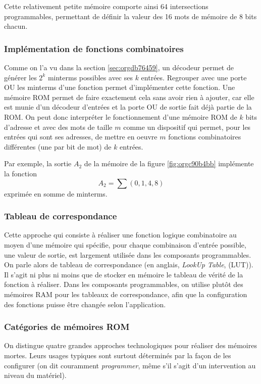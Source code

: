 \documentclass[11pt]{article}
\begin{document}
Cette relativement petite mémoire comporte ainsi 64 intersections
programmables, permettant de définir la valeur des 16 mots de mémoire
de 8 bits chacun.

\subsubsection{Implémentation de fonctions combinatoires}
\label{sec:org1dccb2e}

Comme on l'a vu dans la section \ref{sec:orgdb76459}, un décodeur permet de
générer les \(2^k\) minterms possibles avec ses \(k\)
entrées. Regrouper avec une porte OU les minterms d'une
fonction permet d'implémenter cette fonction. Une mémoire ROM permet
de faire exactement cela sans avoir rien à ajouter, car elle est munie
d'un décodeur d'entrées et la porte OU de sortie fait déjà partie de
la ROM. On peut donc interpréter le fonctionnement d'une mémoire ROM
de \(k\) bits d'adresse et avec des mots de taille \(m\) comme un
dispositif qui permet, pour les entrées qui sont ses adresses, de
mettre en oeuvre \(m\) fonctions combinatoires différentes (une par
bit de mot) de \(k\) entrées.

Par exemple, la sortie \(A_2\) de la mémoire de la figure
\ref{fig:orgc90b4bb} implémente la fonction $$ A_2 = \sum (0,1,4,8) $$
exprimée en somme de minterms.

\subsubsection{Tableau de correspondance}
\label{sec:org2378049}

Cette approche qui consiste à réaliser une fonction logique
combinatoire au moyen d'une mémoire qui spécifie, pour chaque
combinaison d'entrée possible, une valeur de sortie, est largement
utilisée dans les composants programmables. On parle alors de tableau
de correspondance (en anglais, \emph{LookUp Table}, (LUT)). Il s'agit ni
plus ni moins que de stocker en mémoire le tableau de vérité de la
fonction à réaliser. Dans les composants programmables, on utilise
plutôt des mémoires RAM pour les tableaux de correspondance, afin que
la configuration des fonctions puisse être changée selon
l'application.

\subsubsection{Catégories de mémoires ROM}
\label{sec:org6c63aad}

On distingue quatre grandes approches technologiques pour réaliser des
mémoires mortes. Leurs usages typiques sont surtout déterminés par la
façon de les configurer (on dit couramment \emph{programmer}, même s'il
s'agit d'un intervention au niveau du matériel).
\end{document}
